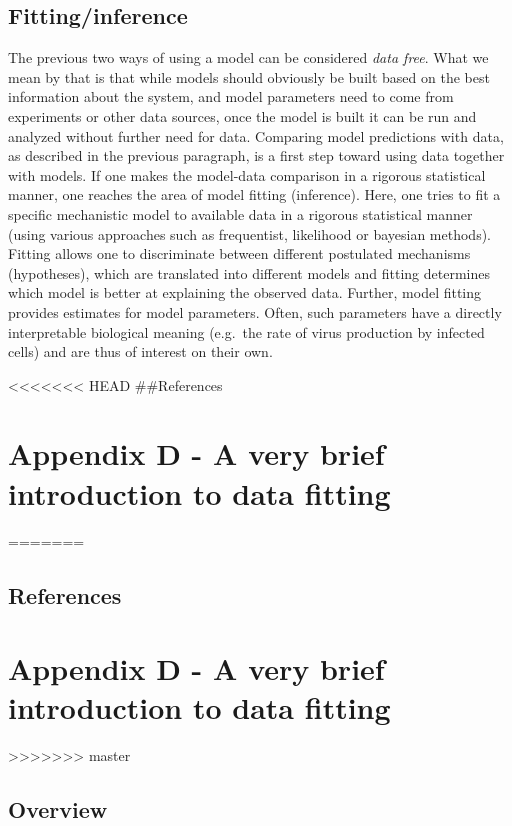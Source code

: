 \documentclass[]{book}
\theoremstyle{definition}
\theoremstyle{definition}
\theoremstyle{definition}
\theoremstyle{remark}
\begin{document}
\hypertarget{fittinginference}{%
\section{Fitting/inference}\label{fittinginference}}

The previous two ways of using a model can be considered \emph{data
free}. What we mean by that is that while models should obviously be
built based on the best information about the system, and model
parameters need to come from experiments or other data sources, once the
model is built it can be run and analyzed without further need for data.
Comparing model predictions with data, as described in the previous
paragraph, is a first step toward using data together with models. If
one makes the model-data comparison in a rigorous statistical manner,
one reaches the area of model fitting (inference). Here, one tries to
fit a specific mechanistic model to available data in a rigorous
statistical manner (using various approaches such as frequentist,
likelihood or bayesian methods). Fitting allows one to discriminate
between different postulated mechanisms (hypotheses), which are
translated into different models and fitting determines which model is
better at explaining the observed data. Further, model fitting provides
estimates for model parameters. Often, such parameters have a directly
interpretable biological meaning (e.g.~the rate of virus production by
infected cells) and are thus of interest on their own.

<<<<<<< HEAD
\#\#References

\hypertarget{appendix-d---a-very-brief-introduction-to-data-fitting}{%
\chapter{Appendix D - A very brief introduction to data
fitting}\label{appendix-d---a-very-brief-introduction-to-data-fitting}}
=======
\section{References}\label{references-21}

\chapter{Appendix D - A very brief introduction to data
fitting}\label{appendix-d---a-very-brief-introduction-to-data-fitting}
>>>>>>> master

\hypertarget{overview-2}{%
\section{Overview}\label{overview-2}}
\end{document}
